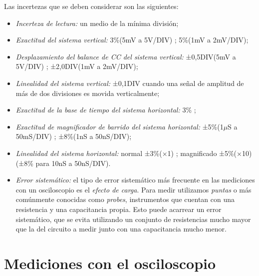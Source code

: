 \documentclass{article}
\begin{document}
	Las incertezas que se deben considerar son las siguientes: 

\begin{itemize}
	\itemsep=3pt \topsep=0pt \partopsep=0pt \parskip=0pt \parsep=0pt

	\item \textit {Incerteza de lectura:} un medio de la mínima división;
	\item  \textit {Exactitud del sistema vertical:} 3\%(5mV a 5V/DIV) ; 5\%(1mV a 2mV/DIV);
	\item  \textit {Desplazamiento del balance de CC del sistema vertical:} ±0,5DIV(5mV a 5V/DIV) ; ±2,0DIV(1mV a 2mV/DIV);
	\item  \textit {Linealidad del sistema vertical:} ±0,1DIV cuando una señal de amplitud de más de dos divisiones es movida verticalmente;
	\item \textit {Exactitud de la base de tiempo del sistema horizontal:} 3\% ;
	\item \textit	{Exactitud de magnificador de barrido del sistema horizontal:} ±5\%(1$\mu$S a 50mS/DIV) ; ±8\%(1nS a 50nS/DIV);
	\item \textit	{Linealidad del sistema horizontal:} normal ±3\%(×1) ; magnificado ±5\%(×10)  (±8\% para 10nS a 50nS/DIV).
	\item \textit{Error sistemático:} el tipo de error sistemático más frecuente en las mediciones con un osciloscopio es el \textit{efecto de carga}. Para medir utilizamos \textit{puntas} o más comúnmente conocidas como \textit{probes}, instrumentos que cuentan con una resistencia y una capacitancia propia. Esto puede acarrear un error sistemático, que se evita utilizando un conjunto de resistencias mucho mayor que la del circuito a medir junto con una capacitancia mucho menor.

\end{itemize}
\newpage




\section{Mediciones con el osciloscopio}
\end{document}
